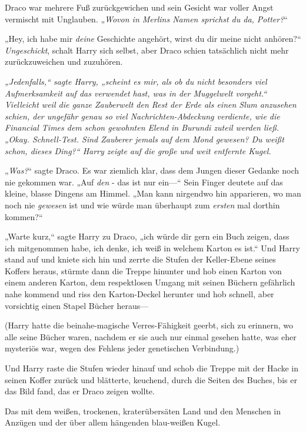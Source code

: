 {Draco war mehrere Fuß zurückgewichen und sein Gesicht war voller Angst vermischt mit Unglauben. „\emph{Wovon in Merlins Namen sprichst du da, Potter?}“

„Hey, ich habe mir \emph{deine} Geschichte angehört, wirst du dir meine nicht anhören?“ \emph{Ungeschickt}, schalt Harry sich selbst, aber Draco schien tatsächlich nicht mehr zurückzuweichen und zuzuhören.

\emph{„Jedenfalls,“ sagte Harry, „scheint es mir, als ob du nicht besonders viel Aufmerksamkeit auf das verwendet hast, was in der Muggelwelt vorgeht.“ Vielleicht weil die ganze Zauberwelt den Rest der Erde als einen Slum anzusehen schien, der ungefähr genau so viel Nachrichten-Abdeckung verdiente, wie die \emph{Financial Times} dem schon gewohnten Elend in Burundi zuteil werden ließ. „Okay. Schnell-Test. Sind Zauberer jemals auf dem Mond gewesen? Du weißt schon, dieses Ding?“ Harry zeigte auf die große und weit entfernte Kugel.}

„\emph{Was?}“ sagte Draco. Es war ziemlich klar, dass dem Jungen dieser Gedanke noch nie gekommen war. „Auf \emph{den} - das ist nur ein—“ Sein Finger deutete auf das kleine, blasse Dingens am Himmel. „Man kann nirgendwo hin apparieren, wo man noch nie \emph{gewesen} ist und wie würde man überhaupt zum \emph{ersten} mal dorthin kommen?“

„Warte kurz,“ sagte Harry zu Draco, „ich würde dir gern ein Buch zeigen, dass ich mitgenommen habe, ich denke, ich weiß in welchem Karton es ist.“ Und Harry stand auf und kniete sich hin und zerrte die Stufen der Keller-Ebene seines Koffers heraus, stürmte dann die Treppe hinunter und hob einen Karton von einem anderen Karton, dem respektlosen Umgang mit seinen Büchern gefährlich nahe kommend und riss den Karton-Deckel herunter und hob schnell, aber vorsichtig einen Stapel Bücher heraus—

(Harry hatte die beinahe-magische Verres-Fähigkeit geerbt, sich zu erinnern, wo alle seine Bücher waren, nachdem er sie auch nur einmal gesehen hatte, was eher mysteriös war, wegen des Fehlens jeder genetischen Verbindung.)

Und Harry raste die Stufen wieder hinauf und schob die Treppe mit der Hacke in seinen Koffer zurück und blätterte, keuchend, durch die Seiten des Buches, bis er das Bild fand, das er Draco zeigen wollte.

Das mit dem weißen, trockenen, kraterübersäten Land und den Menschen in Anzügen und der über allem hängenden blau-weißen Kugel.

}
